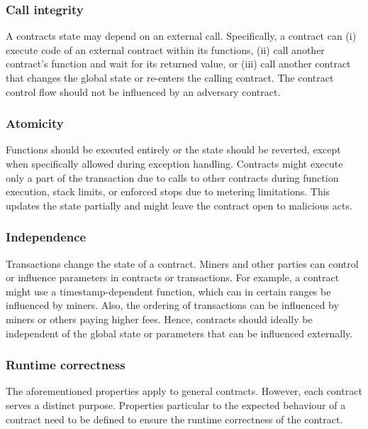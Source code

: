 \subsubsection{Call integrity}
A contracts state may depend on an external call. Specifically, a contract can (i) execute code of an external contract within its functions, (ii) call another contract's function and wait for its returned value, or (iii) call another contract that changes the global state or re-enters the calling contract.
The contract control flow should not be influenced by an adversary contract.

\subsubsection{Atomicity}
Functions should be executed entirely or the state should be reverted, except when specifically allowed during exception handling.
Contracts might execute only a part of the transaction due to calls to other contracts during function execution, stack limits, or enforced stops due to metering limitations.
This updates the state partially and might leave the contract open to malicious acts.

\subsubsection{Independence}
Transactions change the state of a contract. Miners and other parties can control or influence parameters in contracts or transactions. For example, a contract might use a timestamp-dependent function, which can in certain ranges be influenced by miners. Also, the ordering of transactions can be influenced by miners or others paying higher fees. Hence, contracts should ideally be independent of the global state or parameters that can be influenced externally.

\subsubsection{Runtime correctness}
The aforementioned properties apply to general contracts. However, each contract serves a distinct purpose. Properties particular to the expected behaviour of a contract need to be defined to ensure the runtime correctness of the contract.

%

